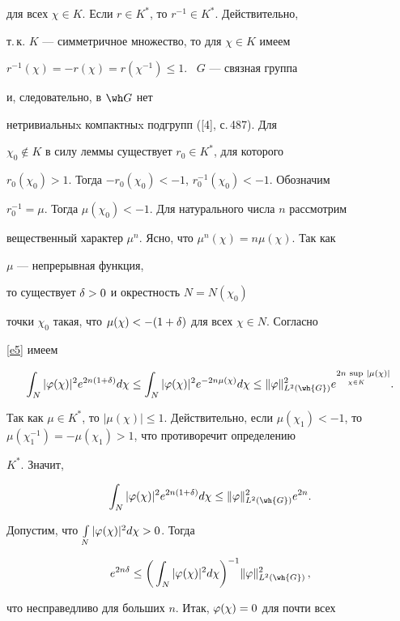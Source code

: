 для всех $\chi\in K$. Если $r\in K^*$, то $r^{-1}\in K^*$. Действительно,


т.\,к. $K$ --- симметричное множество, то для $\chi\in K$ имеем


$r^{-1}(\chi)=-r(\chi)=r(\chi^{-1})\le1$. \ $G$ --- связная группа


и, следовательно, в $\wh G$ нет 


нетривиальныx компактныx подгрупп ([4], с.\,487). Для 


$\chi_0\notin K$ в силу леммы существует $r_0\in K^*$, для которого 


$r_0(\chi_0)>1$. Тогда $-r_0(\chi_0)<-1$, $r_0^{-1}(\chi_0)<-1$. Обозначим 


$r_0^{-1}=\mu$. Тогда $\mu(\chi_0)<-1$. Для натурального числа $n$ рассмотрим 


вещественный характер $\mu^n$. Ясно, что $\mu^n(\chi)=n\mu(\chi)$. Так как 


$\mu$ --- непрерывная функция, 


то существует $\delta>0$ и окрестность $N=N(\chi_0)$ 


точки $\chi_0$ такая, что $\mu(\chi)<-(1+\delta)$ для всех $\chi\in N$. Согласно 


\eqref{e5} имеем


$$


\int_N|\vp(\chi)|^2e^{2n(1+\de)}d\chi\le


\int_N|\vp(\chi)|^2e^{-2n\mu(\chi)}d\chi


\le\|\vp\|^2_{L^2(\wh{G})}e^{2n\sup\li_{\chi\in K}|\mu(\chi)|}.


$$


Так как $\mu\in K^*$, то $|\mu(\chi)|\le 1$. Действительно, если $\mu(\chi_1)


<-1$, то $\mu(\chi_1^{-1})=-\mu(\chi_1)>1$, что противоречит определению 


$K^*$. Значит,


$$


\int_N|\vp(\chi)|^2e^{2n(1+\de)}d\chi\le\|\vp\|^2_{L^2(\wh{G})}e^{2n}.


$$


Допустим, что $\int\limits_N|\varphi(\chi)|^2d\chi>0$. Тогда


$$


e^{2n\de}\le\bigg(\int_N|\vp(\chi)|^2d\chi\bigg)^{-1}


\|\vp\|^2_{L^2({\wh{G}})}\,,


$$


что несправедливо для больших $n$. Итак, $\varphi(\chi)=0$ для почти всех 


